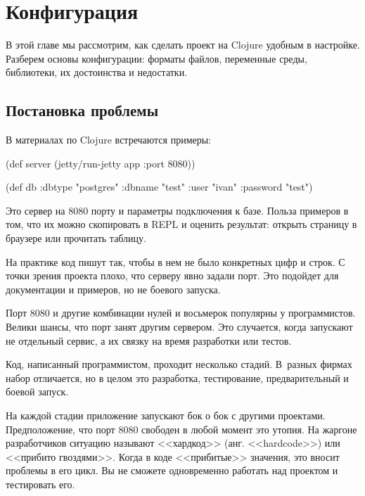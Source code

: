 \chapter{Конфигурация}

\label{chapter-config}

\begin{teaser}
В этой главе мы рассмотрим, как сделать проект на Clojure удобным в
настройке. Разберем основы конфигурации: форматы файлов, переменные среды,
библиотеки, их достоинства и недостатки.
\end{teaser}

\section{Постановка проблемы}

В материалах по Clojure встречаются примеры:

\begin{english}
  \begin{clojure}
(def server
  (jetty/run-jetty app {:port 8080}))

(def db {:dbtype   "postgres"
         :dbname   "test"
         :user     "ivan"
         :password "test"})
  \end{clojure}
\end{english}

Это сервер на 8080 порту и параметры подключения к базе. Польза примеров в том,
что их можно скопировать в REPL и оценить результат: открыть страницу в браузере
или прочитать таблицу.

На практике код пишут так, чтобы в нем не было конкретных цифр и строк. С точки
зрения проекта плохо, что серверу явно задали порт. Это подойдет для
документации и примеров, но не боевого запуска.

Порт 8080 и другие комбинации нулей и восьмерок популярны у
программистов. Велики шансы, что порт занят другим сервером. Это случается,
когда запускают не отдельный сервис, а их связку на время разработки или тестов.

Код, написанный программистом, проходит несколько стадий. В~разных фирмах набор
отличается, но в целом это разработка, тестирование, предварительный и боевой
запуск.

На каждой стадии приложение запускают бок о бок с другими
проектами. Предположение, что порт 8080 свободен в любой момент это утопия. На
жаргоне разработчиков ситуацию называют <<хардкод>> (анг. <<hardcode>>) или
<<прибито гвоздями>>. Когда в коде <<прибитые>> значения, это вносит проблемы в
его цикл. Вы не сможете одновременно работать над проектом и тестировать его.

